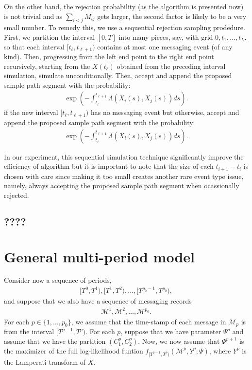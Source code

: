 \documentclass[12pt]{article}%
\begin{document}
On the other hand, the rejection probability (as the algorithm is presented now) is not trivial and as $\sum_{i<j} M_{ij}$ gets larger, the second factor is likely to be a very small number.  To remedy this, we use a sequential rejection sampling prodedure.  First, we partition the interval $[0,T]$ into many pieces, say, with grid $0,t_1,\ldots, t_L$, so that each interval $[t_{\ell},t_{\ell+1})$ contains at most one messaging event (of any kind). Then, progressing from the left end point to the right end point recursively, starting from the $X(t_{\ell})$ obtained from the preceding interval simulation, simulate unconditionally.  Then, accept and append the proposed sample path segment with the probability:
\begin{eqnarray}
\exp\left(-\int_{t_{\ell}}^{t_{\ell+1}} \Lambda(X_i(s),X_j(s)) ds\right).
\end{eqnarray}
if the new interval $[t_{\ell},t_{\ell+1})$ has no messaging event but otherwise, accept and append the proposed sample path segment with the probability:
\begin{eqnarray}
\exp\left(-\int_{t_{\ell}}^{t_{\ell+1}} \overline{\Lambda}(X_i(s),X_j(s)) ds\right).
\end{eqnarray}

In our experiment, this sequential simulation technique significantly improve the efficiency of algorithm but it is important to note that the size of each $t_{i+1} - t_i$ is chosen with care since making it too small creates another rare event type issue, namely, always accepting the proposed sample path segment when ocassionally rejected.   
 

\subsection{????}


\section{General multi-period model}
Consider now a sequence of periods,
\begin{eqnarray}
[T^0,T^1),[T^1,T^2),\ldots, [T^{p_0-1},T^{p_0}),
\end{eqnarray}
and suppose that we also have 
a sequence of messaging records
\begin{eqnarray}
\mathcal M^1,\mathcal M^2,\ldots, \mathcal M^{p_0}.
\end{eqnarray}
For each $p \in \{1,\ldots, p_0\}$, we assume that  
the time-stamp of each message in $\mathcal M_p$ is from the interval 
$[T^{p-1},T^{p})$.  For each $p$, suppose that we have parameter $\Psi^p$ and 
assume that we have the partition $(C_1^p,C_2^p)$. Now, we now assume
that $\Psi^{p+1}$ is the maximizer of the full log-likelihood funtion 
$f_{[T^{p-1},T^{p})}(\mathcal M^p,Y^p;\Psi)$, where $Y^p$ is the Lamperati transform of $X$.  
\end{document}
